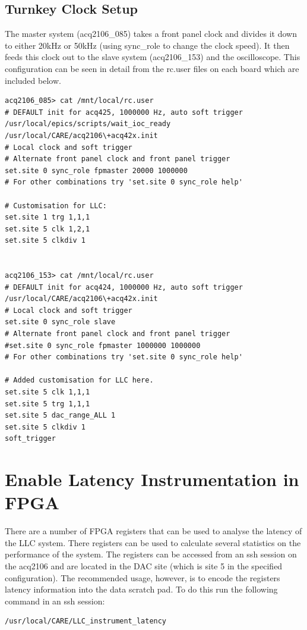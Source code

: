 \documentclass{article}
\begin{document}
\subsection{Turnkey Clock Setup}
The master system (acq2106\_085) takes a front panel clock and divides it down to either 20kHz or 50kHz (using sync\_role to change the clock speed).
It then feeds this clock out to the slave system (acq2106\_153) and the oscilloscope.
This configuration can be seen in detail from the rc.user files on each board which are included below.

\begin{verbatim}
acq2106_085> cat /mnt/local/rc.user
# DEFAULT init for acq425, 1000000 Hz, auto soft trigger
/usr/local/epics/scripts/wait_ioc_ready
/usr/local/CARE/acq2106\+acq42x.init
# Local clock and soft trigger
# Alternate front panel clock and front panel trigger
set.site 0 sync_role fpmaster 20000 1000000
# For other combinations try 'set.site 0 sync_role help'

# Customisation for LLC:
set.site 1 trg 1,1,1
set.site 5 clk 1,2,1
set.site 5 clkdiv 1


acq2106_153> cat /mnt/local/rc.user
# DEFAULT init for acq424, 1000000 Hz, auto soft trigger
/usr/local/CARE/acq2106\+acq42x.init
# Local clock and soft trigger
set.site 0 sync_role slave
# Alternate front panel clock and front panel trigger
#set.site 0 sync_role fpmaster 1000000 1000000
# For other combinations try 'set.site 0 sync_role help'

# Added customisation for LLC here.
set.site 5 clk 1,1,1
set.site 5 trg 1,1,1
set.site 5 dac_range_ALL 1
set.site 5 clkdiv 1
soft_trigger
\end{verbatim}

\section{Enable Latency Instrumentation in FPGA}
There are a number of FPGA registers that can be used to analyse the latency of the LLC system.
There registers can be used to calculate several statistics on the performance of the system.
The registers can be accessed from an ssh session on the acq2106 and are located in the DAC site (which is site 5 in the specified configuration).
The recommended usage, however, is to encode the registers latency information into the data scratch pad.
To do this run the following command in an ssh session:

\begin{verbatim}/usr/local/CARE/LLC_instrument_latency\end{verbatim}
\end{document}
